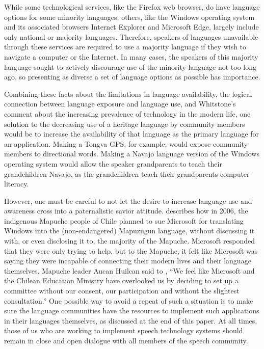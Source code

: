 \documentclass[12pt]{article}
\begin{document}
While some technological services, like the Firefox web browser, do have language options for some minority languages, others, like the Windows operating system and its associated browsers Internet Explorer and Microsoft Edge, largely include only national or majority languages. Therefore, speakers of languages unavailable through these services are required to use a majority language if they wish to navigate a computer or the Internet. In many cases, the speakers of this majority language sought to actively discourage use of the minority language not too long ago, so presenting as diverse a set of language options as possible has importance. \par

Combining these facts about the limitations in language availability, the logical connection between language exposure and language use, and Whitstone's comment about the increasing prevalence of technology in the modern life, one solution to the decreasing use of a heritage language by community members would be to increase the availability of that language as the primary language for an application. Making a Tongva GPS, for example, would expose community members to directional words. Making a Navajo language version of the Windows operating system would allow the speaker grandparents to teach their grandchildren Navajo, as the grandchildren teach their grandparents computer literacy. \par

However, one must be careful to not let the desire to increase language use and awareness cross into a paternalistic savior attitude. \citet{endng} describes how in 2006, the indigenous Mapuche people of Chile planned to sue Microsoft for translating Windows into the (non-endangered) Mapuzugun language, without discussing it with, or even disclosing it to, the majority of the Mapuche. Microsoft responded that they were only trying to help, but to the Mapuche, it felt like Microsoft was saying they were incapable of connecting their modern lives and their language themselves. Mapuche leader Aucan Huilcan said to \citet{ms_news}, ``We feel like Microsoft and the Chilean Education Ministry have overlooked us by deciding to set up a committee without our consent, our participation and without the slightest consultation.'' One possible way to avoid a repeat of such a situation is to make sure the language communities have the resources to implement such applications in their languages themselves, as discussed at the end of this paper. At all times, those of us who are working to implement speech technology systems should remain in close and open dialogue with all members of the speech community. \par
\end{document}
